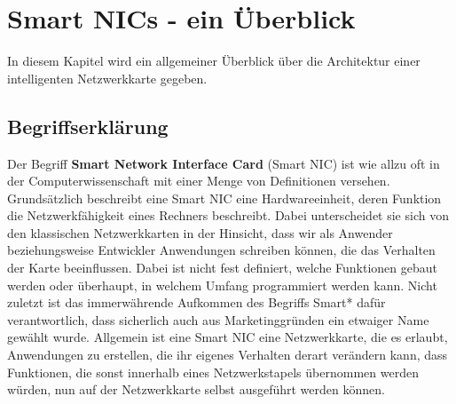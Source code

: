 %
%

\chapter{Smart NICs - ein Überblick}
\label{cha:background}
In diesem Kapitel wird ein allgemeiner Überblick über die Architektur einer intelligenten Netzwerkkarte gegeben.

\section{Begriffserklärung}
Der Begriff \textbf{Smart Network Interface Card} (Smart NIC) ist wie allzu oft in der Computerwissenschaft mit einer Menge von Definitionen versehen. Grundsätzlich beschreibt eine Smart NIC eine Hardwareeinheit, deren Funktion die Netzwerkfähigkeit eines Rechners beschreibt. Dabei unterscheidet sie sich von den klassischen Netzwerkkarten in der Hinsicht, dass wir als Anwender beziehungsweise Entwickler Anwendungen schreiben können, die das Verhalten der Karte beeinflussen. Dabei ist nicht fest definiert, welche Funktionen gebaut werden oder überhaupt, in welchem Umfang programmiert werden kann. Nicht zuletzt ist das immerwährende Aufkommen des Begriffs Smart* dafür verantwortlich, dass sicherlich auch aus Marketinggründen ein etwaiger Name gewählt wurde. Allgemein ist eine Smart NIC eine Netzwerkkarte, die es erlaubt, Anwendungen zu erstellen, die ihr eigenes Verhalten derart verändern kann, dass Funktionen, die sonst innerhalb eines Netzwerkstapels übernommen werden würden, nun auf der Netzwerkkarte selbst ausgeführt werden können. \cite{smartnicsComproSurvey}

